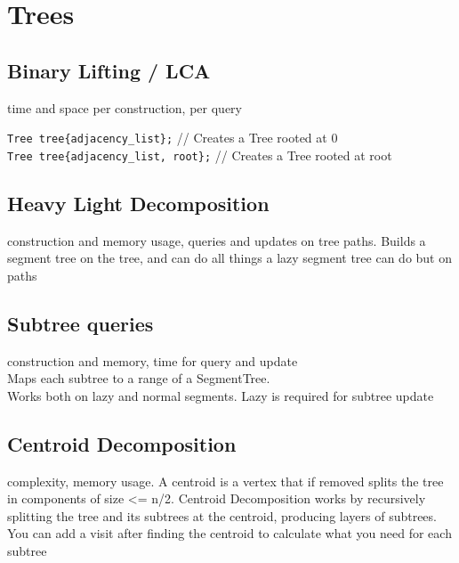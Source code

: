 \section{Trees}

\subsection{Binary Lifting / LCA}
 time and space per construction,  per query

\verb|Tree tree{adjacency_list};| // Creates a Tree rooted at 0 \\
\verb|Tree tree{adjacency_list, root};| // Creates a Tree rooted at root


\subsection{Heavy Light Decomposition}
 construction and memory usage,  queries and updates on tree paths.
Builds a segment tree on the tree, and can do all things a lazy segment tree can do but on paths


\subsection{Subtree queries}
 construction and memory,  time for query and update \\
Maps each subtree to a range of a SegmentTree.\\ 
Works both on lazy and normal segments. Lazy is required for subtree update



\subsection{Centroid Decomposition}
 complexity,  memory usage.
A centroid is a vertex that if removed splits the tree in components of size <= n/2.
Centroid Decomposition works by recursively splitting the tree and its subtrees
at the centroid, producing  layers of subtrees. 
You can add a visit after finding the centroid to calculate what you need for each subtree



